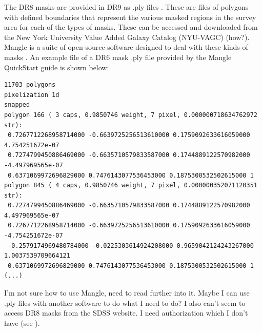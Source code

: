 \documentclass[10pt,letterpaper]{article}
\begin{document}
The DR8 masks are provided in DR9 \cite{image masks} as .ply files \cite{dr9 masks}. These are files of polygons with defined boundaries that represent the various masked regions in the survey area for each of the types of masks. These can be accessed and downloaded from the New York University Value Added Galaxy Catalog (NYU-VAGC) \cite{NYUVAGC} (how?). Mangle is a suite of open-source software designed to deal with these kinds of masks \cite{mangle}. An example file of a DR6 mask .ply file provided by the Mangle QuickStart guide is shown below:\\
\small
\begin{lstlisting}
11703 polygons
pixelization 1d
snapped
polygon 166 ( 3 caps, 0.9850746 weight, 7 pixel, 0.000000718634762972 str):
 0.7267712268958714000 -0.6639725256513610000 0.1759092633616059000 4.754251672e-07
 0.7274799450886469000 -0.6635710579833587000 0.1744889122570982000 -4.497969565e-07
 0.6371069972696829000 0.7476143077536453000 0.1875300532502615000 1
polygon 845 ( 4 caps, 0.9850746 weight, 7 pixel, 0.000000352071120351 str):
 0.7274799450886469000 -0.6635710579833587000 0.1744889122570982000 4.497969565e-07
 0.7267712268958714000 -0.6639725256513610000 0.1759092633616059000 -4.754251672e-07
 -0.2579174969480784000 -0.0225303614924208000 0.9659042124243267000 1.0037539709664121
 0.6371069972696829000 0.7476143077536453000 0.1875300532502615000 1
(...)
\end{lstlisting}
I'm not sure how to use Mangle, need to read further into it. Maybe I can use .ply files with another software to do what I need to do? I also can't seem to access DR8 masks from the SDSS website. I need authorization which I don't have (see \cite{dr9 masks}).\\
\newpage
\end{document}
